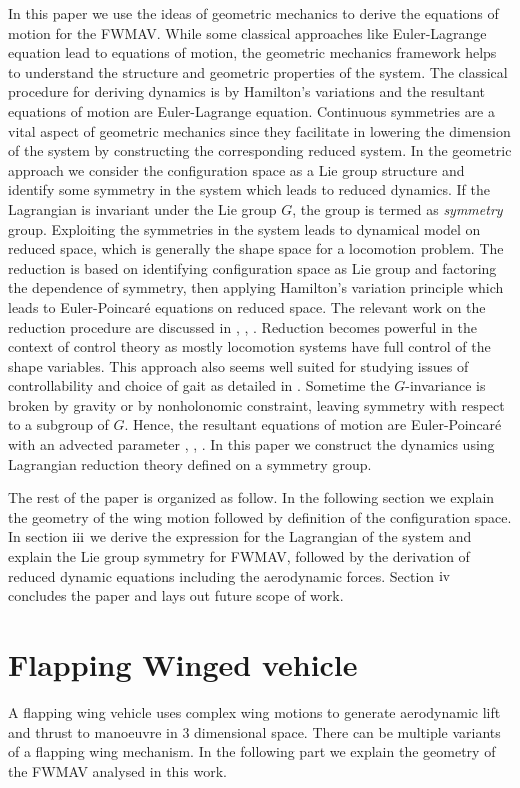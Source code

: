 \documentclass[letterpaper, 10 pt, conference]{ieeeconf}  \newcommand{\RN}[1]{\textup{\uppercase\expandafter{\romannumeral#1}}}
\begin{document}
In this paper we use the ideas of geometric mechanics to derive the equations of motion for the FWMAV. While some classical approaches like Euler-Lagrange equation lead to equations of motion, the geometric mechanics framework helps to understand the structure and geometric properties of the system. The classical procedure for deriving dynamics is by Hamilton's variations and the resultant equations of motion are Euler-Lagrange equation. Continuous symmetries are a vital aspect of geometric mechanics since they facilitate in lowering the dimension of the system by constructing the corresponding reduced system. In the geometric approach we consider the configuration space as a Lie group structure and identify some symmetry in the system which leads to reduced dynamics. If the Lagrangian is invariant under the Lie group $G$, the group is termed as \textit{symmetry} group. Exploiting the symmetries in the system leads to dynamical model on reduced space, which is generally the shape space for a locomotion problem. The reduction is based on identifying configuration space as Lie group and factoring the dependence of symmetry, then applying Hamilton's variation principle which leads to Euler-Poincar\'{e} equations on reduced space. The relevant work on the reduction procedure are discussed in \cite{marsden_krishna_bloch}, \cite{ostrowski}, \cite{cendra}. Reduction becomes powerful in the context of control theory as mostly locomotion systems have full control of the shape variables. This approach also seems well suited for studying issues of controllability and choice of gait as detailed in \cite{kelly murray}. Sometime the $G$-invariance is broken by gravity or by nonholonomic constraint, leaving symmetry with respect to a subgroup of $G$. Hence, the resultant equations of motion are Euler-Poincar\'{e} with an advected parameter \cite{cendra}, \cite{holm}, \cite{gajbhiye_banavar}. In this paper we construct the dynamics using Lagrangian reduction theory defined on a symmetry group. 


The rest of the paper is organized as follow. In the following section we explain the geometry of the wing motion followed by definition of the configuration space. In section $\RN{3}$ we derive the expression for the Lagrangian of the system and explain the Lie group symmetry for FWMAV, followed by the derivation of reduced dynamic equations including the aerodynamic forces. Section $\RN{4}$ concludes the paper and lays out future scope of work.

\section{Flapping Winged vehicle}
A flapping wing vehicle uses complex wing motions to generate aerodynamic lift and thrust to manoeuvre in 3 dimensional space. There can be multiple variants of a  flapping wing mechanism. In the following part we explain the geometry of the FWMAV analysed in this work.
\end{document}
